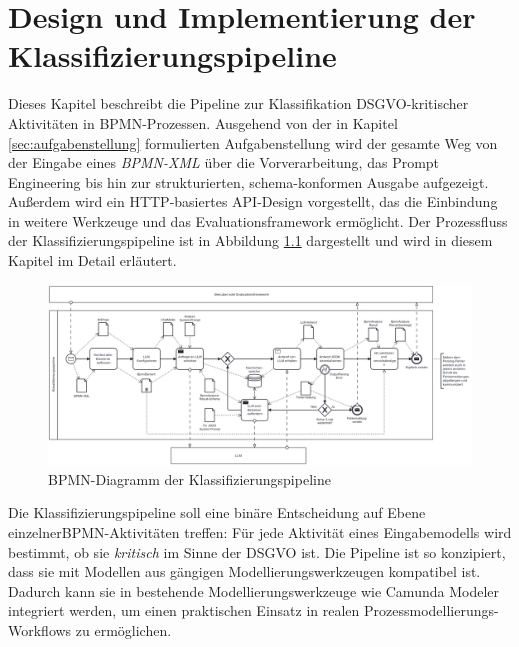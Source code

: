 \chapter{Design und Implementierung der Klassifizierungspipeline}\label{ch:klassifizierungsalgorithmus-(design-und-implementierung)}

Dieses Kapitel beschreibt die Pipeline zur Klassifikation \ac{DSGVO}-kritischer Aktivitäten in \ac{BPMN}-Prozessen. Ausgehend von der in Kapitel \ref{sec:aufgabenstellung} formulierten Aufgabenstellung wird der gesamte Weg von der Eingabe eines \emph{BPMN-XML} über die Vorverarbeitung, das Prompt Engineering bis hin zur strukturierten, schema-konformen Ausgabe aufgezeigt. Außerdem wird ein HTTP-basiertes API-Design vorgestellt, das die Einbindung in weitere Werkzeuge und das Evaluationsframework ermöglicht. Der Prozessfluss der Klassifizierungspipeline ist in Abbildung \ref{fig:architecture-diagram} dargestellt und wird in diesem Kapitel im Detail erläutert.

\begin{figure}[h]
    \centering
    \includegraphics[width=\textwidth]{images/classification/classification-pipeline-diagram}
    \caption{\ac{BPMN}-Diagramm der Klassifizierungspipeline}
    \label{fig:architecture-diagram}
\end{figure}

Die Klassifizierungspipeline soll eine binäre Entscheidung auf Ebene einzelner\linebreak\ac{BPMN}-Aktivitäten treffen: Für jede Aktivität eines Eingabemodells wird bestimmt, ob sie \emph{kritisch} im Sinne der \ac{DSGVO} ist. Die Pipeline ist so konzipiert, dass sie mit Modellen aus gängigen Modellierungswerkzeugen kompatibel ist. Dadurch kann sie in bestehende Modellierungswerkzeuge wie Camunda Modeler \cite{camunda} integriert werden, um einen praktischen Einsatz in realen Prozessmodellierungs-Workflows zu ermöglichen.







